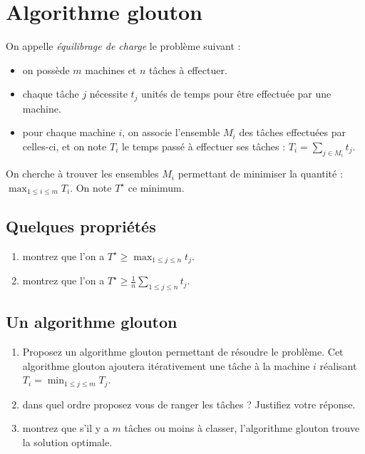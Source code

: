 \documentclass
[12pt]
{article}
\begin{document}
\section{Algorithme glouton}

On appelle {\em équilibrage de charge} le problème suivant : 

\begin{itemize}
    \item on possède $m$ machines et $n$ tâches à effectuer.
    \item chaque tâche $j$ nécessite $t_j$ unités de temps pour être effectuée par une machine.
    \item pour chaque machine $i$, on associe l'ensemble $M_i$ des tâches effectuées par celles-ci, et on note $T_i$ le temps passé à effectuer ses tâches : $T_i = \sum_{j \in M_i} t_j$.
\end{itemize}

On cherche à trouver les ensembles $M_i$ permettant de minimiser la quantité : $\max_{1\leq i \leq m} T_i$. On note $T^\star$ ce minimum.

\subsection{Quelques propriétés}
\begin{enumerate}
    \item montrez que l'on a $T^\star \geq \max_{1 \leq j\leq n} t_j$.
    \item montrez que l'on a $T^\star \geq \frac{1}{n}\sum_{1 \leq j\leq n} t_j$.
\end{enumerate}

\subsection{Un algorithme glouton}

\begin{enumerate}
    \item Proposez un algorithme glouton permettant de résoudre le problème. Cet algorithme glouton ajoutera itérativement une tâche à la machine $i$ réalisant $T_i = \min_{1\leq j \leq m} T_j$.
    \item dans quel ordre proposez vous de ranger les tâches ? Justifiez votre réponse.
    \item montrez que s'il y a $m$ tâches ou moins à classer, l'algorithme glouton trouve la solution optimale.
\end{enumerate}
\end{document}
